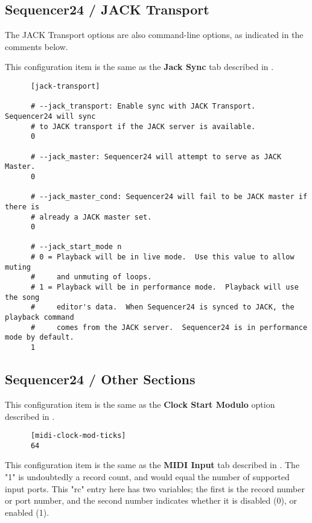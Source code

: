 \subsection{Sequencer24 / JACK Transport}
\label{subsec:seq24_rc_file_jack_transport}

   The JACK Transport options are also command-line options, as indicated in
   the comments below.

   This configuration item is the same as the 
   \textbf{Jack Sync} tab described in
   .

   \begin{verbatim}
      [jack-transport]

      # --jack_transport: Enable sync with JACK Transport.  Sequencer24 will sync
      # to JACK transport if the JACK server is available.
      0

      # --jack_master: Sequencer24 will attempt to serve as JACK Master.
      0

      # --jack_master_cond: Sequencer24 will fail to be JACK master if there is
      # already a JACK master set.
      0

      # --jack_start_mode n
      # 0 = Playback will be in live mode.  Use this value to allow muting
      #     and unmuting of loops.
      # 1 = Playback will be in performance mode.  Playback will use the song
      #     editor's data.  When Sequencer24 is synced to JACK, the playback command
      #     comes from the JACK server.  Sequencer24 is in performance mode by default.
      1
   \end{verbatim}

\subsection{Sequencer24 / Other Sections}
\label{subsec:seq24_rc_file_other_midi}

   This configuration item is the same as the
   \textbf{Clock Start Modulo} option described in
   .

   \begin{verbatim}
      [midi-clock-mod-ticks]
      64
   \end{verbatim}

   This configuration item is the same as the 
   \textbf{MIDI Input} tab described in
   .
   The "1" is undoubtedly a record count, and would equal the number of
   supported input ports.
   This "rc" entry here has two variables; the first is the record number or
   port number, and the second number indicates whether it is disabled (0),
   or enabled (1).


